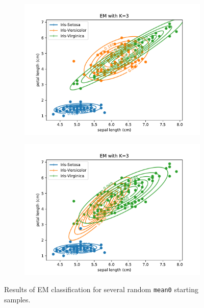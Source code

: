 \documentclass{article}
\begin{document}
\begin{figure}[!ht]
{\begin{subfigure}{0.6\textwidth}
	\includegraphics[width=\textwidth]{./Figures/2_1_EM_randinit2}
	\end{subfigure}
	\begin{subfigure}{0.6\textwidth}
	\includegraphics[width=\textwidth]{./Figures/2_1_EM_randinit3}
	\end{subfigure}
	}	
	\caption{Results of EM classification for several random \texttt{mean0} starting samples.}
	\label{2_1_EM_randinit}
\end{figure}

\newpage
\end{document}

